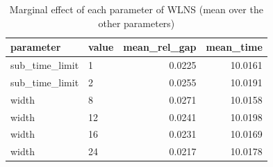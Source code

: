 \begin{table}[htbp]
\centering
\small
\caption{Marginal effect of each parameter of WLNS (mean over the other parameters)}
\label{tab:E8b_tuning_budget_WLNS_marginal}
\begin{tabular}{llrr}
\toprule
parameter & value & mean\_rel\_gap & mean\_time \\
\midrule
sub\_time\_limit & 1 & 0.0225 & 10.0161 \\
sub\_time\_limit & 2 & 0.0255 & 10.0191 \\
width & 8 & 0.0271 & 10.0158 \\
width & 12 & 0.0241 & 10.0198 \\
width & 16 & 0.0231 & 10.0169 \\
width & 24 & 0.0217 & 10.0178 \\
\bottomrule
\end{tabular}
\end{table}
